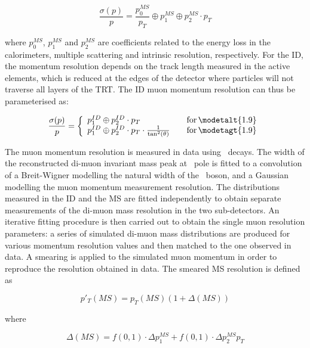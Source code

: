 \begin{equation}
\frac{ \sigma (p) }{ p } = \frac{ p_{0}^{MS} }{ p_{T} } \oplus  p_{1}^{MS}
\oplus  p_{2}^{MS} \cdot p_{T}
\end{equation}

where $p_{0}^{MS}$, $p_{1}^{MS}$ and $p_{2}^{MS}$ are coefficients related to
the energy loss in the calorimeters, multiple scattering and intrinsic
resolution, respectively. For the ID, the momentum resolution depends on the
track length measured in the active elements, which is reduced at the edges of
the detector where particles will not traverse all layers of the TRT. The ID
muon momentum resolution can thus be parameterised as:

\begin{equation}
\frac{ \sigma (p) }{ p } = \left\{
    \begin{array}{l l}
        p_{1}^{ID} \oplus  p_{2}^{ID} \cdot p_{T}  & \quad {\rm
for}\, \modetalt{1.9} \\
    p_{1}^{ID} \oplus  p_{2}^{ID} \cdot p_{T} \cdot
\frac{1}{\tan ^{2} (\theta)}  & \quad {\rm for}\, \modetagt{1.9} \\
  \end{array} \right.
\end{equation}

The muon momentum resolution is measured in data using \Zmm\ decays. The width
of the reconstructed di-muon invariant mass peak at \Z\ pole is fitted to a
convolution of a Breit-Wigner modelling the natural width of the \Z\ boson, and
a Gaussian modelling the muon momentum measurement resolution. The distributions
measured in the ID and the MS are fitted independently to obtain separate
measurements of the di-muon mass resolution in the two sub-detectors.  An
iterative fitting procedure is then carried out to obtain the single muon
resolution parameters: a series of simulated di-muon mass distributions are
produced for various momentum resolution values and then matched to the one
observed in data.  A smearing is applied to the simulated muon momentum in order
to reproduce the resolution obtained in data. The smeared MS resolution is
defined as

\begin{equation}
p'_{T}(MS) = p_{T}(MS) (1+\Delta(MS))
\end{equation}

 where 

\begin{equation}
\Delta(MS) = f(0,1) \cdot \Delta p_{1}^{MS} +  f(0,1) \cdot \Delta p_{2}^{MS} p_{T}
\end{equation}

